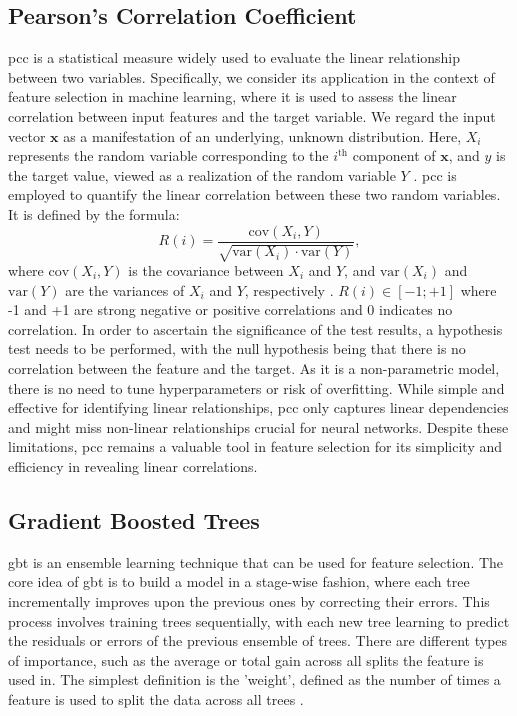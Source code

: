 \documentclass[12pt, a4paper, headinclude, twoside, plainheadsepline, open=right, numbers=noenddot, hidelinks, toc=listof, toc=bibliography]{scrreprt}
\begin{document}
\subsection{Pearson's Correlation Coefficient}
\label{ssec:pearsons}
\Ac{pcc} is a statistical measure widely used to evaluate the linear relationship between two variables. 
Specifically, we consider its application in the context of feature selection in machine learning, where it is used to assess the linear correlation between input features and the target variable. 
We regard the input vector $\mathbf{x}$ as a manifestation of an underlying, unknown distribution. 
Here, $X_i$ represents the random variable corresponding to the $i^{\text{th}}$ component of $\mathbf{x}$, and $y$ is the target value, viewed as a realization of the random variable $Y$ \cite{guyonIntroductionVariableFeature2003}. 
\Ac{pcc} is employed to quantify the linear correlation between these two random variables. It is defined by the formula:
\begin{equation}
R(i) = \frac{\text{cov}(X_i, Y)}{\sqrt{\text{var}(X_i) \cdot \text{var}(Y)}},
\end{equation}
where $\text{cov}(X_i, Y)$ is the covariance between $X_i$ and $Y$, and $\text{var}(X_i)$ and $\text{var}(Y)$ are the variances of $X_i$ and $Y$, respectively \cite{chandrashekarSurveyFeatureSelection2014}.
$R(i) \in [-1; +1]$ where -1 and +1 are strong negative or positive correlations and 0 indicates no correlation. 
In order to ascertain the significance of the test results, a hypothesis test needs to be performed, with the null hypothesis being that there is no correlation between the feature and the target.
As it is a non-parametric model, there is no need to tune hyperparameters or risk of overfitting.
While simple and effective for identifying linear relationships, \ac{pcc} only captures linear dependencies and might miss non-linear relationships crucial for neural networks.
Despite these limitations, \ac{pcc} remains a valuable tool in feature selection for its simplicity and efficiency in revealing linear correlations.

\subsection{Gradient Boosted Trees}
\label{ssec:gbt}

\Ac{gbt} is an ensemble learning technique that can be used for feature selection. 
The core idea of \ac{gbt} is to build a model in a stage-wise fashion, where each tree incrementally improves upon the previous ones by correcting their errors. 
This process involves training trees sequentially, with each new tree learning to predict the residuals or errors of the previous ensemble of trees.
There are different types of importance, such as the average or total gain across all splits the feature is used in.
The simplest definition is the 'weight', defined as the number of times a feature is used to split the data across all trees \cite{chenXGBoostScalableTree2016}.
\end{document}
